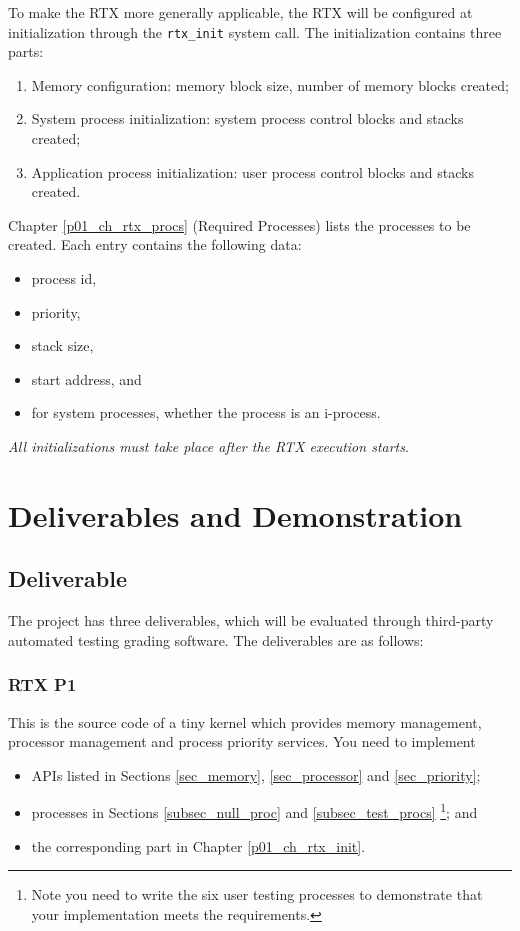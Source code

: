 To make the RTX more generally applicable, the RTX will be configured at initialization through the \verb+rtx_init+ system call.
The initialization contains three parts:
\begin{enumerate}
\item Memory configuration: memory block size, number of memory blocks created;
\item System process initialization: system process control blocks and stacks created; 
\item Application process initialization: user process control blocks and stacks created. 
\end{enumerate}

Chapter \ref{p01_ch_rtx_procs} (Required Processes) lists the processes to be created. Each entry contains the following data:
\begin{itemize} 
\item process id, 
\item priority, 
\item stack size, 
\item start address, and 
\item for system processes, whether the process is an i-process. 
\end{itemize}
{\em All initializations must take place after the RTX execution starts}.

\chapter{Deliverables and Demonstration}
\section{Deliverable}

The project has three deliverables, which will be evaluated through third-party automated testing grading software. 
The deliverables are as follows: 

\subsection{\bf RTX P1} 
This is the source code
of a tiny kernel which provides memory management, processor management and process priority services. You need to implement 
\begin{itemize}
\item APIs listed in Sections \ref{sec_memory}, \ref{sec_processor} and \ref{sec_priority}; 
\item processes in Sections \ref{subsec_null_proc} and \ref{subsec_test_procs}
      \footnote{Note you need to write the six user testing processes to demonstrate that your implementation meets the requirements.};  and 
\item the corresponding part in Chapter \ref{p01_ch_rtx_init}. 
\end{itemize}


